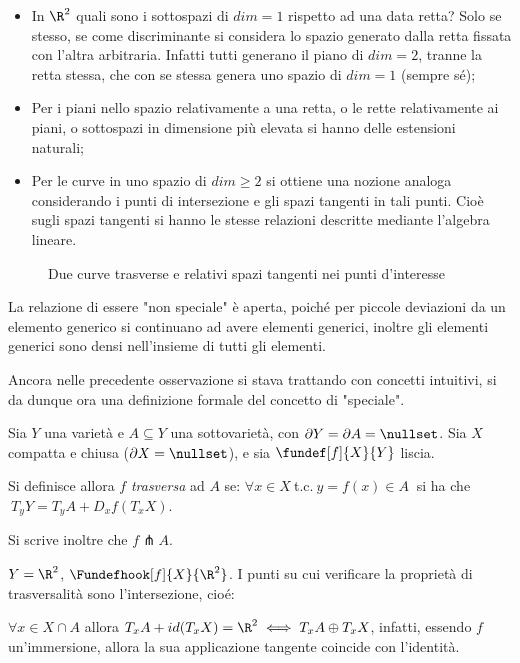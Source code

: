 \begin{es}
\begin{itemize}
\item In $\R^2$ quali sono i sottospazi di $dim = 1$ rispetto ad una data retta? Solo se stesso, se come discriminante si considera lo spazio generato dalla retta fissata con l'altra arbitraria. Infatti tutti generano il piano di $dim = 2$, tranne la retta stessa, che con se stessa genera uno spazio di $dim = 1$ (sempre sé);
\item Per i piani nello spazio relativamente a una retta, o le rette relativamente ai piani, o sottospazi in dimensione più elevata si hanno delle estensioni naturali;
\item Per le curve in uno spazio di $dim \geq 2$ si ottiene una nozione analoga considerando i punti di intersezione e gli spazi tangenti in tali punti. Cioè sugli spazi tangenti si hanno le stesse relazioni descritte mediante l'algebra lineare.
\end{itemize}

\begin{figure}[h]
\centering

\caption{Due curve trasverse e relativi spazi tangenti nei punti d'interesse}
\end{figure}
\end{es}

\begin{oss}
La relazione di essere "non speciale" è aperta, poiché per piccole deviazioni da un elemento generico si continuano ad avere elementi generici, inoltre gli elementi generici sono densi nell'insieme di tutti gli elementi.
\end{oss}

Ancora nelle precedente osservazione si stava trattando con concetti intuitivi, si da dunque ora una definizione formale del concetto di "speciale".

\begin{defn}[Trasversalità]
Sia $Y$ una varietà e $A\subseteq Y$ una sottovarietà, con $\partial Y = \partial A = \nullset$. Sia $X$ compatta e chiusa ($\partial X = \nullset$), e sia $\fundef[f]{X}{Y}$ liscia.

Si definisce allora $f$ \emph{trasversa} ad $A$ se: $\forall x \in X~$t.c.$~y = f(x) \in A~$ si ha che $~T_yY = T_yA + D_xf(T_xX)$.

Si scrive inoltre che $f \pitchfork A$.
\end{defn}

\begin{es}
$Y = \R^2$, $\Fundefhook[f]{X}{\R^2}$. I punti su cui verificare la proprietà di trasversalità sono l'intersezione, cioé:

$\forall x \in X \cap A$ allora $T_xA + id(T_xX) = \R^2 \iff T_xA \oplus T_xX$, infatti, essendo $f$ un'immersione, allora la sua applicazione tangente coincide con l'identità.
\end{es}

